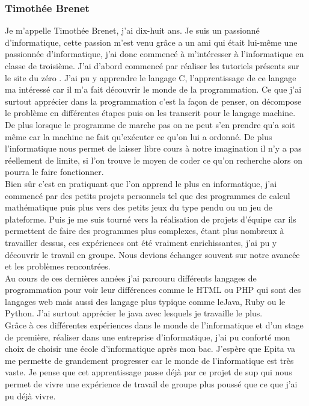 \documentclass[12pt]{article}
\begin{document}
\subsubsection{Timothée Brenet}

Je m'appelle Timothée Brenet, j'ai dix-huit ans. Je suis un passionné d'informatique, cette passion m'est venu grâce a un ami qui était lui-même une passionnée d'informatique, j'ai donc commencé à m'intéresser à l'informatique en classe de troisième. J'ai d'abord commencé par réaliser les tutoriels présents sur le site du zéro \cite{sdz}. J'ai pu y apprendre le langage \gls{C}, l'apprentissage de ce langage ma intéressé car il m'a fait découvrir le monde de la programmation. Ce que j'ai surtout apprécier dans la programmation c'est la façon de penser, on décompose le problème en différentes étapes puis on les transcrit pour le langage machine.\\

De plus lorsque le programme de marche pas on ne peut s'en prendre qu'a soit même car la machine ne fait qu'exécuter ce qu'on lui a ordonné. De plus l'informatique nous permet de laisser libre cours à notre imagination il n'y a pas réellement de limite, si l'on trouve le moyen de coder ce qu'on recherche alors on pourra le faire fonctionner.\\

Bien sûr c'est en pratiquant que l'on apprend le plus en informatique, j'ai commencé par des petits projets personnels tel que des programmes de calcul mathématique puis plus vers des petits jeux du type pendu ou un jeu de plateforme. Puis je me suis tourné vers la réalisation de projets d'équipe car ils permettent de faire des programmes plus complexes, étant plus nombreux à travailler dessus, ces expériences ont été vraiment enrichissantes, j'ai pu y découvrir le travail en groupe. Nous devions échanger souvent sur notre avancée et les problèmes rencontrées.\\

Au cours de ces dernières années j'ai parcouru différents langages de programmation pour voir leur différences comme le \gls{HTML} ou \gls{PHP} qui sont des langages web mais aussi des langage plus typique comme le\gls{Java}, \gls{Ruby} ou le \gls{Python}. J'ai surtout apprécier le java avec lesquels je travaille le plus.\\

Grâce à ces différentes expériences dans le monde de l'informatique et d'un stage de première, réaliser dans une entreprise d'informatique, j'ai pu conforté mon choix de choisir une école d'informatique après mon bac. J'espère que Epita va me permette de grandement progresser car le monde de l'informatique est très vaste. Je pense que cet apprentissage passe déjà par ce projet de sup qui nous permet de vivre une expérience de travail de groupe plus poussé que ce que j'ai pu déjà vivre.\\
\end{document}

